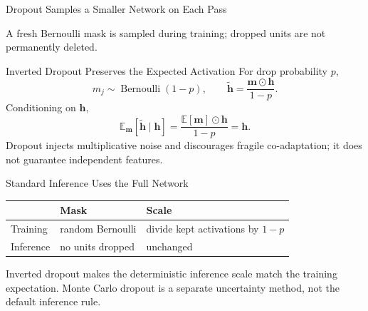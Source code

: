 \documentclass{ntuabeamer}
\begin{document}
\begin{frame}{Dropout Samples a Smaller Network on Each Pass}
  \centering

  A fresh Bernoulli mask is sampled during training; dropped units are not permanently deleted.
\end{frame}

\begin{frame}{Inverted Dropout Preserves the Expected Activation}
  For drop probability $p$,
  \[
    m_j\sim\operatorname{Bernoulli}(1-p),
    \qquad
    \widetilde{\mathbf h}
    =\frac{\mathbf m\odot\mathbf h}{1-p}.
  \]
  Conditioning on $\mathbf h$,
  \[
    \mathbb E_{\mathbf m}[\widetilde{\mathbf h}\mid\mathbf h]
    =\frac{\mathbb E[\mathbf m]\odot\mathbf h}{1-p}
    =\mathbf h.
  \]
  Dropout injects multiplicative noise and discourages fragile co-adaptation; it does not guarantee independent features.
\end{frame}

\begin{frame}{Standard Inference Uses the Full Network}
  \begin{center}
    \begin{tabular}{lll}
      \toprule
      & \textbf{Mask} & \textbf{Scale}\\
      \midrule
      Training & random Bernoulli & divide kept activations by $1-p$\\
      Inference & no units dropped & unchanged\\
      \bottomrule
    \end{tabular}
  \end{center}
  \vspace{0.5cm}
  Inverted dropout makes the deterministic inference scale match the training expectation.
  Monte Carlo dropout is a separate uncertainty method, not the default inference rule.
\end{frame}
\end{document}
